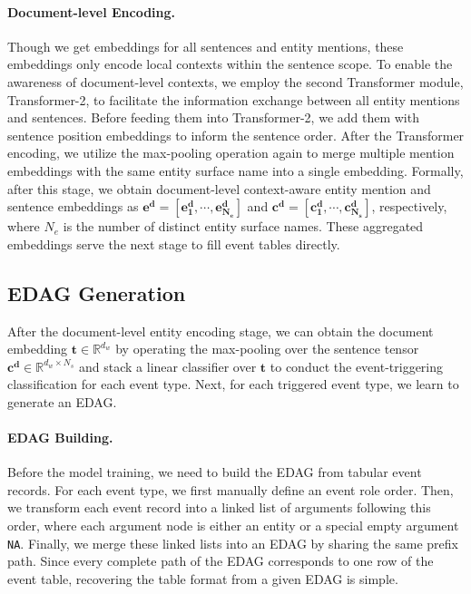 \documentclass[11pt,a4paper]{article}
\newcommand{\R}{{\mathbb{R}}}
\begin{document}
\paragraph{Document-level Encoding.}
Though we get embeddings for all sentences and entity mentions, these embeddings only encode local contexts within the sentence scope.
To enable the awareness of document-level contexts, we employ the second Transformer module, Transformer-2, to facilitate the information exchange between all entity mentions and sentences.
Before feeding them into Transformer-2, we add them with sentence position embeddings to inform the sentence order.
After the Transformer encoding, we utilize the max-pooling operation again to merge multiple mention embeddings with the same entity surface name into a single embedding.
Formally, after this stage, we obtain document-level context-aware entity mention and sentence embeddings as
$\bm{e^d} = [\bm{e^d_1},\cdots,\bm{e^d_{N_e}}]$ and $\bm{c^d} = [\bm{c^d_1},\cdots,\bm{c^d_{N_s}}]$, respectively,
where $N_e$ is the number of distinct entity surface names.
These aggregated embeddings serve the next stage to fill event tables directly.

\subsection{EDAG Generation}
\label{sec:dag_gen}
After the document-level entity encoding stage, we can obtain the document embedding $\bm{t} \in \R^{d_w}$ by operating the max-pooling over the sentence tensor $\bm{c^d} \in \R^{d_w\times N_s}$ and stack a linear classifier over $\bm{t}$ to conduct the event-triggering classification for each event type.
Next, for each triggered event type, we learn to generate an EDAG.

\paragraph{EDAG Building.}
Before the model training, we need to build the EDAG from tabular event records.
For each event type, we first manually define an event role order.
Then, we transform each event record into a linked list of arguments following this order, where each argument node is either an entity or a special empty argument \texttt{NA}.
Finally, we merge these linked lists into an EDAG by sharing the same prefix path.
Since every complete path of the EDAG corresponds to one row of the event table, recovering the table format from a given EDAG is simple.
\end{document}
